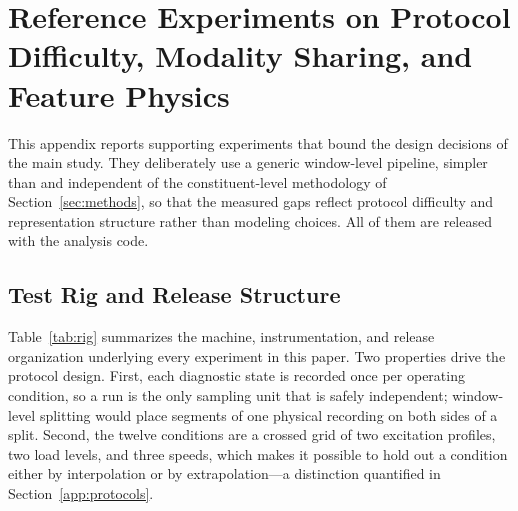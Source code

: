 \appendices
\section{Reference Experiments on Protocol Difficulty, Modality Sharing,
and Feature Physics}
\label{app:reference}

This appendix reports supporting experiments that bound the design decisions
of the main study. They deliberately use a generic window-level pipeline,
simpler than and independent of the constituent-level methodology of
Section~\ref{sec:methods}, so that the measured gaps reflect protocol
difficulty and representation structure rather than modeling choices. All of
them are released with the analysis code.

\subsection{Test Rig and Release Structure}
\label{app:rig}

Table~\ref{tab:rig} summarizes the machine, instrumentation, and release
organization underlying every experiment in this paper. Two properties drive
the protocol design. First, each diagnostic state is recorded once per
operating condition, so a run is the only sampling unit that is safely
independent; window-level splitting would place segments of one physical
recording on both sides of a split. Second, the twelve conditions are a
crossed grid of two excitation profiles, two load levels, and three speeds,
which makes it possible to hold out a condition either by interpolation or by
extrapolation---a distinction quantified in
Section~\ref{app:protocols}.


